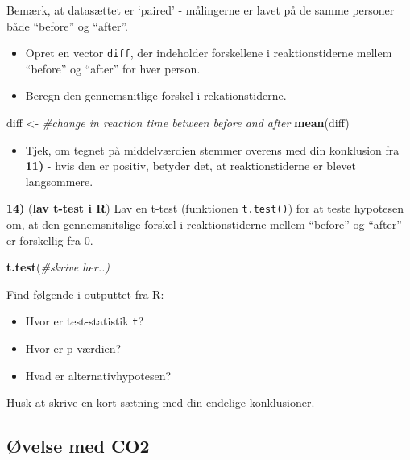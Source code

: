 \documentclass[
]{book}
\newenvironment{Shaded}{\begin{snugshade}}{\end{snugshade}}
\newcommand{\CommentTok}[1]{\textcolor[rgb]{0.56,0.35,0.01}{\textit{#1}}}
\newcommand{\FunctionTok}[1]{\textcolor[rgb]{0.13,0.29,0.53}{\textbf{#1}}}
\newcommand{\NormalTok}[1]{#1}
\newcommand{\OtherTok}[1]{\textcolor[rgb]{0.56,0.35,0.01}{#1}}
\providecommand{\tightlist}{%
  \setlength{\itemsep}{0pt}\setlength{\parskip}{0pt}}
\theoremstyle{definition}
\theoremstyle{definition}
\theoremstyle{definition}
\theoremstyle{definition}
\theoremstyle{remark}
\begin{document}
Bemærk, at datasættet er `paired' - målingerne er lavet på de samme personer både ``before'' og ``after''.

\begin{itemize}
\tightlist
\item
  Opret en vector \texttt{diff}, der indeholder forskellene i reaktionstiderne mellem ``before'' og ``after'' for hver person.
\item
  Beregn den gennemsnitlige forskel i rekationstiderne.
\end{itemize}

\begin{Shaded}
\begin{Highlighting}[]
\NormalTok{diff }\OtherTok{\textless{}{-}} \CommentTok{\#change in reaction time between before and after}
\FunctionTok{mean}\NormalTok{(diff)}
\end{Highlighting}
\end{Shaded}

\begin{itemize}
\tightlist
\item
  Tjek, om tegnet på middelværdien stemmer overens med din konklusion fra \textbf{11)} - hvis den er positiv, betyder det, at reaktionstiderne er blevet langsommere.
\end{itemize}

\textbf{14)} (\textbf{lav t-test i R}) Lav en t-test (funktionen \texttt{t.test()}) for at teste hypotesen om, at den gennemsnitslige forskel i reaktionstiderne mellem ``before'' og ``after'' er forskellig fra 0.

\begin{Shaded}
\begin{Highlighting}[]
\FunctionTok{t.test}\NormalTok{(}\CommentTok{\#skrive her..)}
\end{Highlighting}
\end{Shaded}

Find følgende i outputtet fra R:

\begin{itemize}
\tightlist
\item
  Hvor er test-statistik \texttt{t}?
\item
  Hvor er p-værdien?
\item
  Hvad er alternativhypotesen?
\end{itemize}

Husk at skrive en kort sætning med din endelige konklusioner.

\subsection{Øvelse med CO2}\label{uxf8velse-med-co2}
\end{document}
